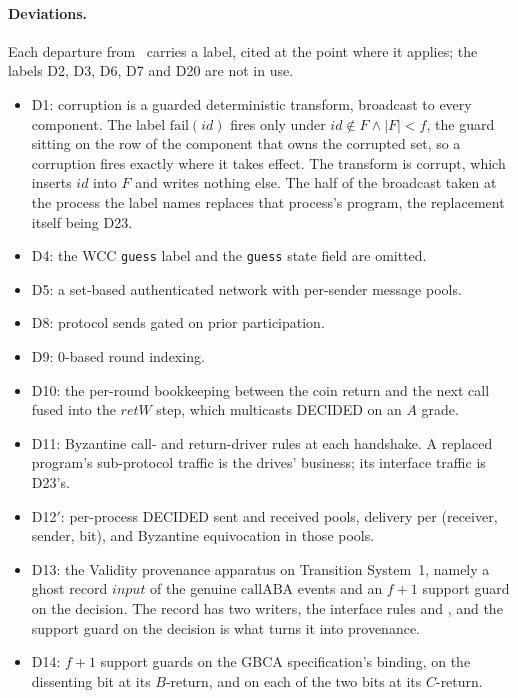 \paragraph{Deviations.}
Each departure from~\cite{LeslieBP} carries a label, cited at the point where it applies; the labels D2, D3, D6, D7 and D20 are not in use.
\begin{itemize}
  \item D1: corruption is a guarded deterministic transform, broadcast to every component.
    The label $\mathrm{fail}(id)$ fires only under $id \notin F \wedge |F| < f$, the guard sitting on the row of the component that owns the corrupted set, so a corruption fires exactly where it takes effect.
    The transform is $\mathrm{corrupt}$, which inserts $id$ into $F$ and writes nothing else.
    The half of the broadcast taken at the process the label names replaces that process's program, the replacement itself being D23.
  \item D4: the WCC \texttt{guess} label and the \texttt{guess} state field are omitted.
  \item D5: a set-based authenticated network with per-sender message pools.
  \item D8: protocol sends gated on prior participation.
  \item D9: $0$-based round indexing.
  \item D10: the per-round bookkeeping between the coin return and the next call fused into the $retW$ step, which multicasts DECIDED on an $A$ grade.
  \item D11: Byzantine call- and return-driver rules at each handshake.
    A replaced program's sub-protocol traffic is the drives' business; its interface traffic is D23's.
  \item D12$'$: per-process DECIDED sent and received pools, delivery per (receiver, sender, bit), and Byzantine equivocation in those pools.
  \item D13: the Validity provenance apparatus on Transition System~1, namely a ghost record $input$ of the genuine $\mathrm{callABA}$ events and an $f+1$ support guard  on the decision.
    The record has two writers, the interface rules  and , and the support guard on the decision is what turns it into provenance.
  \item D14: $f+1$ support guards on the GBCA specification's binding, on the dissenting bit at its $B$-return, and on each of the two bits at its $C$-return.

\end{itemize}
